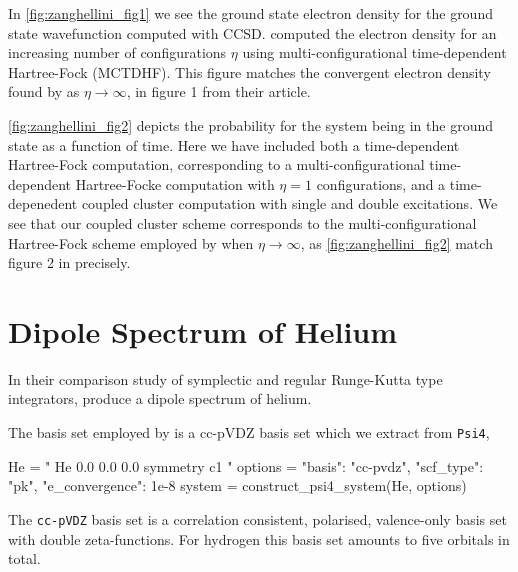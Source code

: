 In \autoref{fig:zanghellini_fig1} we see the ground state electron density for the 
ground state wavefunction computed with CCSD. \citeauthor{Zanghellini04} computed the electron
density for an increasing number of configurations $\eta$ using multi-configurational
time-dependent Hartree-Fock (MCTDHF). This figure matches the convergent electron density found by
\citeauthor{Zanghellini04} as $\eta \to \infty$, in figure 1 from their article. 

\autoref{fig:zanghellini_fig2} depicts the probability for the system being in the ground 
state as a function of time. Here we have included both a time-dependent Hartree-Fock
computation, corresponding to a multi-configurational time-dependent 
Hartree-Focke computation with $\eta=1$ configurations, and 
a time-depenedent coupled cluster computation with single and double excitations.
We see that our coupled cluster scheme corresponds to the multi-configurational Hartree-Fock 
scheme employed by \citeauthor{Zanghellini04} when $\eta\to\infty$, as
\autoref{fig:zanghellini_fig2} match figure 2 in
\citeauthor{Zanghellini04}\cite{Zanghellini04} precisely.


\section{Dipole Spectrum of Helium}

In their comparison study of symplectic and regular Runge-Kutta type integrators, 
\citeauthor{pedersen2019symplectic}\cite{pedersen2019symplectic} produce a dipole 
spectrum of helium. 

The basis set employed by \citeauthor{pedersen2019symplectic} is a cc-pVDZ 
basis set which we extract from \lstinline{Psi4},
\begin{python}
He = "
    He 0.0 0.0 0.0
    symmetry c1
"
options = {"basis": "cc-pvdz", "scf_type": "pk", "e_convergence": 1e-8}
system = construct_psi4_system(He, options)
\end{python}
The \lstinline{cc-pVDZ} basis set is a correlation consistent, polarised, valence-only 
basis set with double zeta-functions. For hydrogen this basis set amounts to five 
orbitals in total.

